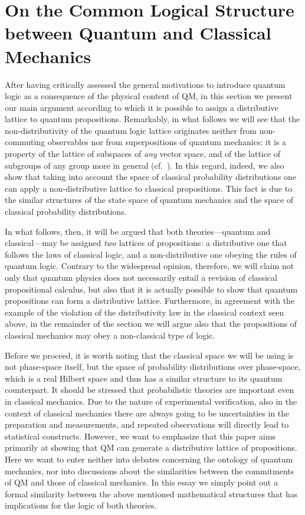 \documentclass[11pt, executivepaper]{article}
\begin{document}
\section{On the Common Logical Structure between Quantum and Classical Mechanics}
\label{Math}

After having critically assessed the general motivations to introduce quantum logic as a consequence of the physical content of QM, in this section we present our main argument according to which it is possible to assign a distributive lattice to quantum propositions. Remarkably, in what follows we will see that the non-distributivity of the quantum logic lattice originates neither from non-commuting observables nor from superpositions of quantum mechanics: it is a property of the lattice of subspaces of \emph{any} vector space, and of the lattice of subgroups of any group more in general (cf.\ \cite{Davey:2002}). In this regard, indeed, we also show that taking into account the space of classical probability distributions one can apply a non-distributive lattice to classical propositions. This fact is due to the similar structures of the state space of quantum mechanics and the space of classical probability distributions. 

In what follows, then, it will be argued that both theories---quantum and classical---may be assigned \emph{two} lattices of propositions: a distributive one that follows the laws of classical logic, and a non-distributive one obeying the rules of quantum logic. Contrary to the widespread opinion, therefore, we will claim not only that quantum physics does not necessarily entail a revision of classical propositional calculus, but also that it is actually possible to show that quantum propositions can form a distributive lattice. Furthermore, in agreement with the example of the violation of the distributivity law in the classical context seen above, in the remainder of the section we will argue also that the propositions of classical mechanics may obey a non-classical type of logic. 

Before we proceed, it is worth noting that the classical space we will be using is not phase-space itself, but the space of probability distributions over phase-space, which is a real Hilbert space and thus has a similar structure to its quantum counterpart. It should be stressed that probabilistic theories are important even in classical mechanics. Due to the nature of experimental verification, also in the context of classical mechanics there are always going to be uncertainties in the preparation and measurements, and repeated observations will directly lead to statistical constructs.
However, we want to emphasize that this paper aims primarily at showing that QM can generate a distributive lattice of propositions. Here we want to enter neither into debates concerning the ontology of quantum mechanics, nor into discussions about the similarities between the commitments of QM and those of classical mechanics. In this essay we simply point out a formal similarity between the above mentioned mathematical structures that has implications for the logic of both theories. 
\end{document}
